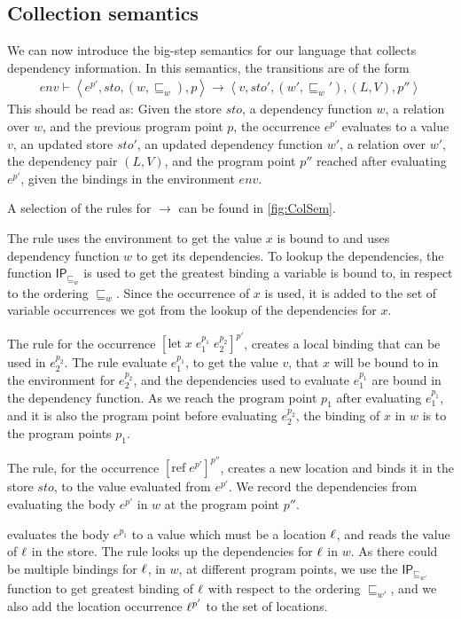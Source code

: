 \documentclass{llncs}
\newcommand{\sqleq}{\ensuremath{\sqsubseteq\xspace}}
\newcommand{\refc}{\ensuremath{\textrm{ref}\xspace}}
\newcommand{\IP}{\ensuremath{\textsf{IP}}\xspace}
\begin{document}
\subsection{Collection semantics}\label{sec:sem}

We can now introduce the big-step semantics for our language that
collects dependency information. In this semantics, the transitions
are of the form
%
\begin{align*}
env\vdash\left\langle e^{p'},sto,(w,\sqleq_w),p\right\rangle\rightarrow\left\langle v,sto',(w',\sqleq_w'),(L,V),p''\right\rangle
\end{align*}
%
This should be read as: Given the store $sto$, a dependency function
$w$, a relation over $w$, and the previous program point $p$, the
occurrence $e^{p'}$ evaluates to a value $v$, an updated store $sto'$,
an updated dependency function $w'$, a relation over $w'$, the
dependency pair $(L,V)$, and the program point $p''$ reached after
evaluating $e^{p'}$, given the bindings in the environment $env$. 

A selection of the rules for $\rightarrow$ can be found in
\cref{fig:ColSem}.

The  rule  uses the environment to get the value $x$ is bound to and uses dependency function $w$ to get its dependencies.
		To lookup the dependencies, the function $\IP_{\sqleq_w}$ is used to get the greatest binding a variable is bound to, in respect to the ordering $\sqleq_w$.
		Since the occurrence of $x$ is used, it is added to the set of variable occurrences we got from the lookup of the dependencies for $x$.

The  rule for the occurrence $[\mbox{let}\;x\;e_1^{p_1}\;e_2^{p_2}]^{p'}$, creates a local binding that can be used in $e_2^{p_2}$.
		The  rule evaluate $e_1^{p_1}$, to get the value $v$, that $x$ will be bound to in the environment for $e_2^{p_2}$, and the dependencies used to evaluate $e_1^{p_1}$ are bound in the dependency function.
		As we reach the program point $p_1$ after evaluating $e_1^{p_1}$, and it is also the program point before evaluating $e_2^{p_2}$, the binding of $x$ in $w$ is to the program points $p_1$.	

The  rule, for the occurrence $[\refc\;e^{p'}]^{p''}$,
creates a new location and binds it in the store $sto$, to the value
evaluated from $e^{p'}$. We record the dependencies from evaluating
the body $e^{p'}$ in $w$ at the program point $p''$.

 evaluates the body $e^{p_1}$ to a value which
must be a location $\ell$, and reads the value of $\ell$ in the store.
		The  rule looks up the dependencies for
                $\ell$ in $w$.
		As there could be multiple bindings for $\ell$, in $w$, at different program points, we use the $\IP_{\sqleq_{w'}}$ function to get greatest binding of $\ell$ with respect to the ordering $\sqleq_{w'}$, 
		and we also add the location occurrence $\ell^{p'}$ to the set of locations.
\end{document}
